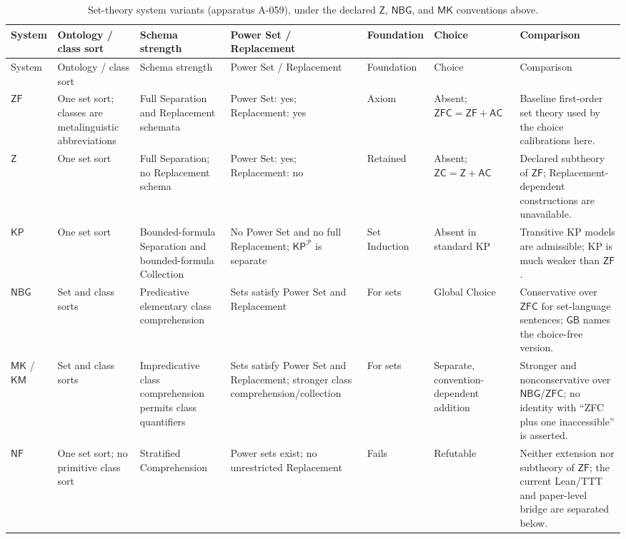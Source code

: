 \begin{landscape}
\begingroup\scriptsize
\setlength{\tabcolsep}{2.5pt}
\begin{longtable}{@{}p{.48in}p{.95in}p{1.15in}p{1.05in}p{.70in}
  p{.85in}p{1.65in}@{}}
\caption{Set-theory system variants (apparatus A-059), under the declared
  \(\mathsf Z\), \(\mathsf{NBG}\), and \(\mathsf{MK}\) conventions above.}
\label{tab:p06-set-theory-variants}\\
\toprule
System & Ontology / class sort & Schema strength & Power Set / Replacement &
Foundation & Choice & Comparison \\
\midrule
\endfirsthead
\toprule
System & Ontology / class sort & Schema strength & Power Set / Replacement &
Foundation & Choice & Comparison \\
\midrule
\endhead
\(\mathsf{ZF}\) & One set sort; classes are metalinguistic abbreviations &
Full Separation and Replacement schemata & Power Set: yes; Replacement: yes &
Axiom & Absent; \(\mathsf{ZFC}=\mathsf{ZF}+\mathsf{AC}\) & Baseline
first-order set theory used by the choice calibrations here. \\
\(\mathsf Z\) & One set sort & Full Separation; no Replacement schema &
Power Set: yes; Replacement: no & Retained & Absent;
\(\mathsf{ZC}=\mathsf Z+\mathsf{AC}\) & Declared subtheory of \(\mathsf{ZF}\);
Replacement-dependent constructions are unavailable. \\
\(\mathsf{KP}\) & One set sort & Bounded-formula Separation and
bounded-formula Collection & No Power Set and no full Replacement;
\(\mathsf{KP}^{\mathcal P}\) is separate & Set Induction & Absent in standard
KP & Transitive KP models are admissible; KP is much weaker than
\(\mathsf{ZF}\). \\
\(\mathsf{NBG}\) & Set and class sorts & Predicative elementary class
comprehension & Sets satisfy Power Set and Replacement & For sets & Global
Choice & Conservative over \(\mathsf{ZFC}\) for set-language sentences;
\(\mathsf{GB}\) names the choice-free version. \\
\(\mathsf{MK}\) / \(\mathsf{KM}\) & Set and class sorts & Impredicative class
comprehension permits class quantifiers & Sets satisfy Power Set and
Replacement; stronger class comprehension/collection & For sets & Separate,
convention-dependent addition & Stronger and nonconservative over
\(\mathsf{NBG}\)/\(\mathsf{ZFC}\); no identity with ``ZFC plus one
inaccessible'' is asserted. \\
\(\mathsf{NF}\) & One set sort; no primitive class sort & Stratified
Comprehension & Power sets exist; no unrestricted Replacement & Fails &
Refutable & Neither extension nor subtheory of \(\mathsf{ZF}\); the current
Lean/TTT and paper-level bridge are separated below. \\
\bottomrule
\end{longtable}
\endgroup
\end{landscape}

